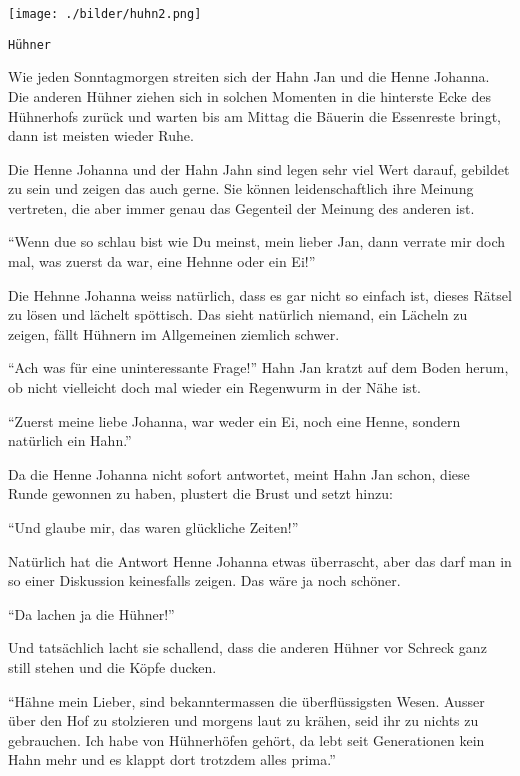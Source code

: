\thispagestyle{empty}
\begin{center}
\texttt{[image: ./bilder/huhn2.png]}
\end{center}
\vskip 2cm
{\Huge\color{farbe}\hfill{\tt{Hühner}}}
\newpage
\lettrine[lines=2, lhang=.2, loversize=.25, lraise=0.05, findent=0.1em,
nindent=0em]{W}{}ie jeden Sonntagmorgen streiten sich der Hahn Jan und die
Henne Johanna. Die anderen Hühner ziehen sich in solchen Momenten in die
hinterste Ecke des Hühnerhofs zurück und warten bis am Mittag die Bäuerin die
Essenreste bringt, dann ist meisten wieder Ruhe. 

Die Henne Johanna und der Hahn Jahn sind legen sehr viel Wert darauf, gebildet
zu sein und zeigen das auch gerne. Sie können leidenschaftlich ihre Meinung
vertreten, die aber immer genau das Gegenteil der Meinung des anderen ist. 

\enquote{Wenn due so schlau bist wie Du meinst, mein lieber Jan, dann verrate
mir doch mal, was zuerst da war, eine Hehnne oder ein Ei!}

Die Hehnne Johanna weiss natürlich, dass es gar nicht so einfach ist, dieses
Rätsel zu lösen und lächelt spöttisch. Das sieht natürlich niemand, ein Lächeln
zu zeigen, fällt Hühnern im Allgemeinen ziemlich schwer.


\enquote{Ach was für eine uninteressante Frage!} Hahn Jan kratzt auf dem Boden
herum, ob nicht vielleicht doch mal wieder ein Regenwurm in der Nähe ist. 

\enquote{Zuerst meine liebe Johanna, war weder ein Ei, noch eine Henne, sondern natürlich ein Hahn.}

Da die Henne Johanna nicht sofort antwortet, meint Hahn Jan schon, diese Runde
gewonnen zu haben, plustert die Brust und setzt hinzu:


\enquote{Und glaube mir, das waren glückliche Zeiten!}

Natürlich hat die Antwort Henne Johanna etwas überrascht, aber das darf man in
so einer Diskussion keinesfalls zeigen. Das wäre ja noch schöner.

\enquote{Da lachen ja die Hühner!}

Und tatsächlich lacht sie schallend, dass die anderen Hühner vor Schreck ganz
still stehen und die Köpfe ducken.


\enquote{Hähne mein Lieber, sind bekanntermassen die überflüssigsten Wesen.
Ausser über den Hof zu stolzieren und morgens laut zu krähen, seid ihr zu
nichts zu gebrauchen. Ich habe von Hühnerhöfen gehört, da lebt seit
Generationen kein Hahn mehr und es klappt dort trotzdem alles prima.}

